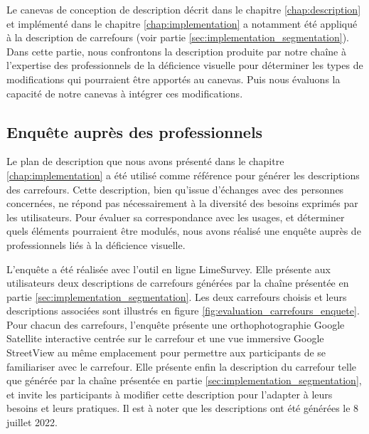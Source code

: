 Le canevas de conception de description décrit dans le chapitre \ref{chap:description} et implémenté dans le chapitre \ref{chap:implementation} a notamment été appliqué à la description de carrefours (voir partie \ref{sec:implementation_segmentation}). Dans cette partie, nous confrontons la description produite par notre chaîne à l'expertise des professionnels de la déficience visuelle pour déterminer les types de modifications qui pourraient être apportés au canevas. Puis nous évaluons la capacité de notre canevas à intégrer ces modifications.

\subsection{Enquête auprès des professionnels}

Le plan de description que nous avons présenté dans le chapitre \ref{chap:implementation} a été utilisé comme référence pour générer les descriptions des carrefours. Cette description, bien qu'issue d'échanges avec des personnes concernées, ne répond pas nécessairement à la diversité des besoins exprimés par les utilisateurs. Pour évaluer sa correspondance avec les usages, et déterminer quels éléments pourraient être modulés, nous avons réalisé une enquête auprès de professionnels liés à la déficience visuelle.

\newpar{}

L'enquête a été réalisée avec l'outil en ligne LimeSurvey. Elle présente aux utilisateurs deux descriptions de carrefours générées par la chaîne présentée en partie \ref{sec:implementation_segmentation}. Les deux carrefours choisis et leurs descriptions associées sont illustrés en figure \ref{fig:evaluation_carrefours_enquete}. Pour chacun des carrefours, l'enquête présente une orthophotographie Google Satellite interactive centrée sur le carrefour et une vue immersive Google StreetView au même emplacement pour permettre aux participants de se familiariser avec le carrefour. Elle présente enfin la description du carrefour telle que générée par la chaîne présentée en partie \ref{sec:implementation_segmentation}, et invite les participants à modifier cette description pour l'adapter à leurs besoins et leurs pratiques. Il est à noter que les descriptions ont été générées le 8 juillet 2022.


